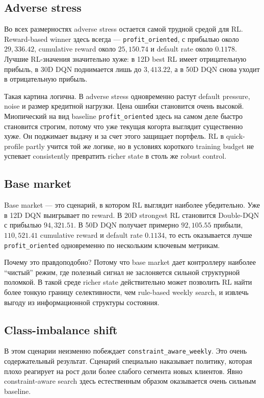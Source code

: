 \documentclass[12pt,a4paper]{article}
\begin{document}
\subsection{Adverse stress}

Во всех размерностях adverse stress остается самой трудной средой для RL. Reward-based winner здесь всегда --- \texttt{profit\_oriented}, с прибылью около $29{,}336.42$, cumulative reward около $25{,}150.74$ и default rate около $0.1178$. Лучшие RL-значения значительно хуже: в 12D best RL имеет отрицательную прибыль, в 30D DQN поднимается лишь до $3{,}413.22$, а в 50D DQN снова уходит в отрицательную прибыль.

Такая картина логична. В adverse stress одновременно растут default pressure, noise и размер кредитной нагрузки. Цена ошибки становится очень высокой. Миопический на вид baseline \texttt{profit\_oriented} здесь на самом деле быстро становится строгим, потому что уже текущая когорта выглядит существенно хуже. Он поджимает выдачу и за счет этого защищает портфель. RL в quick-profile partly учится той же логике, но в условиях короткого training budget не успевает consistently превратить richer state в столь же robust control.

\subsection{Base market}

Base market --- это сценарий, в котором RL выглядит наиболее убедительно. Уже в 12D DQN выигрывает по reward. В 20D strongest RL становится Double-DQN с прибылью $94{,}321.51$. В 50D DQN получает примерно $92{,}105.55$ прибыли, $110{,}521.41$ cumulative reward и default rate $0.1134$, то есть оказывается лучше \texttt{profit\_oriented} одновременно по нескольким ключевым метрикам.

Почему это правдоподобно? Потому что base market дает контроллеру наиболее ``чистый'' режим, где полезный сигнал не заслоняется сильной структурной поломкой. В такой среде richer state действительно может позволить RL найти более тонкую границу селективности, чем rule-based weekly search, и извлечь выгоду из информационной структуры состояния.

\subsection{Class-imbalance shift}

В этом сценарии неизменно побеждает \texttt{constraint\_aware\_weekly}. Это очень содержательный результат. Сценарий специально наказывает политику, которая плохо реагирует на рост доли более слабого сегмента новых клиентов. Явно constraint-aware search здесь естественным образом оказывается очень сильным baseline.
\end{document}
